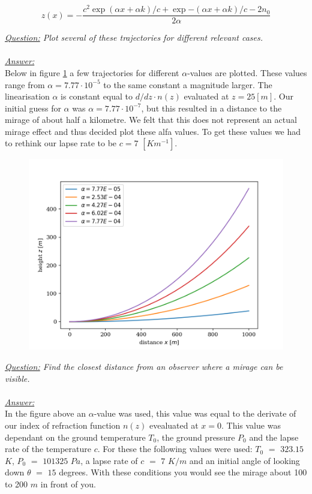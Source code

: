 \documentclass{article}
\begin{document}
\begin{equation}
	z(x)=-\frac{c^2 \exp{(\alpha x + \alpha k)/c}+\exp{-(\alpha x + \alpha k)/c}-2n_0}{2 \alpha}
	\label{eq:magic_wolfram}
\end{equation}

\textit{\underline{Question:} Plot several of these trajectories for different relevant cases.}\\
\\
\textit{\underline{Answer:}} \\
Below in figure \ref{fig:paths} a few trajectories for different $\alpha$-values are plotted. These values range from $\alpha = 7.77 \cdot 10^{-5}$ to the same constant a magnitude larger. The linearisation $\alpha$ is constant equal to $d/dz \cdot n(z)$ evaluated at $z=25 [m]$. Our initial guess for $\alpha$ was $\alpha = 7.77 \cdot 10^{-7}$, but this resulted in a distance to the mirage of about half a kilometre. We felt that this does not represent an actual mirage effect and thus decided plot these alfa values. To get these values we had to rethink our lapse rate to be $c = 7$ $[Km^{-1}]$.\\

\begin{figure}[h!]
	\centering
	\includegraphics[width=0.5\linewidth,keepaspectratio]{afbeeldingen/light path.png}
	\label{fig:paths}
\end{figure}
\textit{\underline{Question:} Find the closest distance from an observer where a mirage can be visible.}\\
\\
\textit{\underline{Answer:}} \\
In the figure above an $\alpha$-value was used, this value was equal to the derivate of our index of refraction function $n(z)$ evealuated at $x=0$. This value was dependant on the ground temperature $T_0$, the ground pressure $P_0$ and the lapse rate of the temperature $c$. For these the following values were used: $T_0$ $=$ $323.15$ $K$, $P_0$ $=$ $101325$ $Pa$, a lapse rate of $c$ $=$ $7$ $K/m$ and an initial angle of looking down $\theta$ $=$ $15$ degrees. With these conditions you would see the mirage about 100 to 200 $m$ in front of you.\\
\end{document}
